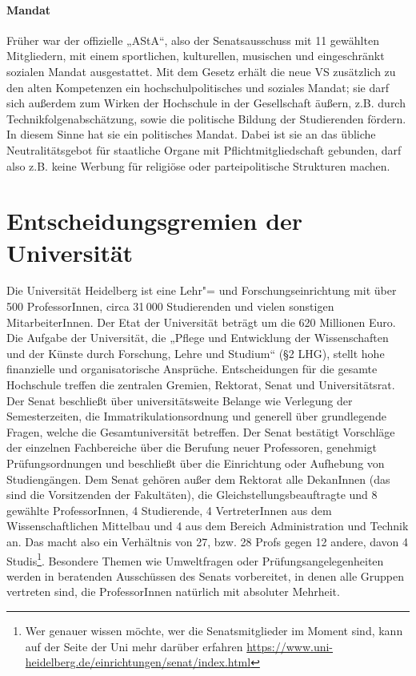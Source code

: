 \paragraph{Mandat}

Früher war der offizielle „AStA“, also der Senatsausschuss mit 11 gewählten Mitgliedern, mit einem sportlichen, kulturellen, musischen und eingeschränkt sozialen Mandat ausgestattet. Mit dem Gesetz erhält die neue VS zusätzlich zu den alten Kompetenzen ein hochschulpolitisches und soziales Mandat; sie darf sich außerdem zum Wirken der Hochschule in der Gesellschaft äußern, z.B. durch Technikfolgenabschätzung, sowie die politische Bildung der Studierenden fördern. In diesem Sinne hat sie ein politisches Mandat. Dabei ist sie an das übliche Neutralitätsgebot für staatliche Organe mit Pflichtmitgliedschaft gebunden, darf also z.B. keine Werbung für religiöse oder parteipolitische Strukturen machen.

\section{Entscheidungsgremien der Universität}

Die Universität Heidelberg ist eine Lehr"= und Forschungseinrichtung mit über 500 ProfessorInnen, circa 31\,000 Studierenden und vielen sonstigen MitarbeiterInnen. Der Etat der Universität beträgt um die 620 Millionen Euro. Die Aufgabe der Universität, die „Pflege und Entwicklung der Wissenschaften und der Künste durch Forschung, Lehre und Studium“ (§2 LHG), stellt hohe finanzielle und organisatorische Ansprüche. Entscheidungen für die gesamte Hochschule treffen die zentralen Gremien, Rektorat, Senat und Universitätsrat. Der Senat beschließt über universitätsweite Belange wie Verlegung der Semesterzeiten, die Immatrikulationsordnung und generell über grundlegende Fragen, welche die Gesamtuniversität betreffen. Der Senat bestätigt Vorschläge der einzelnen Fachbereiche über die Berufung neuer Professoren, genehmigt Prüfungsordnungen und beschließt über die Einrichtung oder Aufhebung von Studiengängen. Dem Senat gehören außer dem Rektorat alle DekanInnen (das sind die Vorsitzenden der Fakultäten), die Gleichstellungsbeauftragte und 8 gewählte ProfessorInnen, 4 Studierende, 4 VertreterInnen aus dem Wissenschaftlichen Mittelbau und 4 aus dem Bereich Administration und Technik an. Das macht also ein Verhältnis von 27, bzw. 28 Profs gegen 12 andere, davon 4 Studis\footnote{Wer genauer wissen möchte, wer die Senatsmitglieder im Moment sind, kann auf der Seite der Uni mehr darüber erfahren \url{https://www.uni-heidelberg.de/einrichtungen/senat/index.html}}. Besondere Themen wie Umweltfragen oder Prüfungsangelegenheiten werden in beratenden Ausschüssen des Senats vorbereitet, in denen alle Gruppen vertreten sind, die ProfessorInnen natürlich mit absoluter Mehrheit. 


